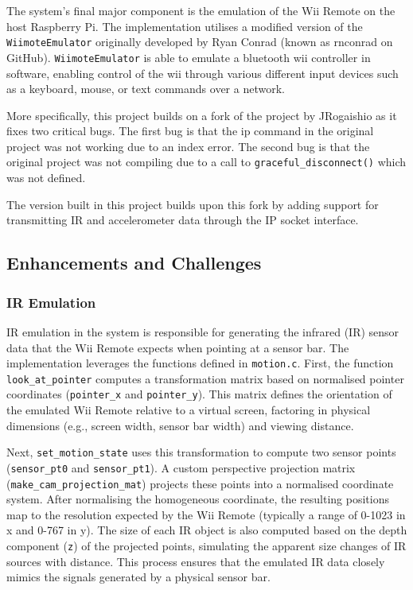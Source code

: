 The system’s final major component is the emulation of the Wii Remote on the host
Raspberry Pi. The implementation utilises a modified version of the
\texttt{WiimoteEmulator} originally developed by Ryan
Conrad\cite{wiimote_emulator} (known as rnconrad on GitHub).
\texttt{WiimoteEmulator} is able to emulate a bluetooth wii controller in
software, enabling control of the wii through various different input devices such
as a keyboard, mouse, or text commands over a network.

More specifically, this project builds on a fork of the project by
JRogaishio\cite{jr_wiimote_emu} as it fixes two critical bugs. The first bug is
that the ip command in the original project was not working due to an index
error. The second bug is that the original project was not compiling due to a
call to \texttt{graceful\_disconnect()} which was not defined.

The version built in this project\cite{kf_wiimote_emu} builds upon this fork by adding support for transmitting IR and accelerometer data through the IP socket interface.

\subsection{Enhancements and Challenges}


\subsubsection{IR Emulation}

IR emulation in the system is responsible for generating the infrared (IR)
sensor data that the Wii Remote expects when pointing at a sensor bar. The
implementation leverages the functions defined in \texttt{motion.c}. First, the
function \texttt{look\_at\_pointer} computes a transformation matrix based on
normalised pointer coordinates (\texttt{pointer\_x} and \texttt{pointer\_y}).
This matrix defines the orientation of the emulated Wii Remote relative to a
virtual screen, factoring in physical dimensions (e.g., screen width, sensor bar
width) and viewing distance.

Next, \texttt{set\_motion\_state} uses this transformation to compute two sensor
points (\texttt{sensor\_pt0} and \texttt{sensor\_pt1}).  A custom perspective projection matrix \linebreak(\texttt{make\_cam\_projection\_mat}) projects these points into a normalised coordinate system. After normalising the homogeneous coordinate, the resulting positions map to
the resolution expected by the Wii Remote (typically a range of 0-1023 in x and
0-767 in y). The size of each IR object is also computed based on the depth
component (\texttt{z}) of the projected points, simulating the apparent size
changes of IR sources with distance. This process ensures that the emulated IR
data closely mimics the signals generated by a physical sensor bar.

